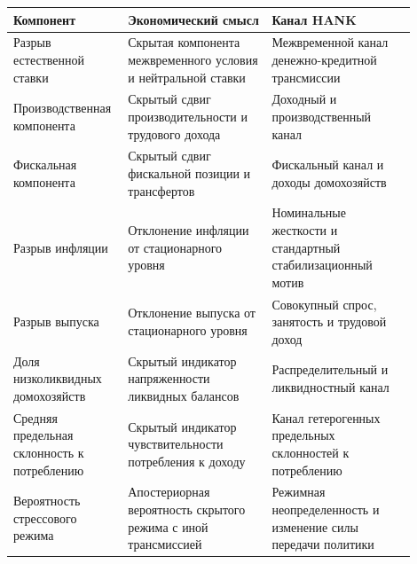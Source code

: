 \begin{tabular}{p{0.22\linewidth}p{0.34\linewidth}p{0.34\linewidth}}
\toprule
Компонент & Экономический смысл & Канал HANK \\
\midrule
Разрыв естественной ставки & Скрытая компонента межвременного условия и нейтральной ставки & Межвременной канал денежно-кредитной трансмиссии \\
Производственная компонента & Скрытый сдвиг производительности и трудового дохода & Доходный и производственный канал \\
Фискальная компонента & Скрытый сдвиг фискальной позиции и трансфертов & Фискальный канал и доходы домохозяйств \\
Разрыв инфляции & Отклонение инфляции от стационарного уровня & Номинальные жесткости и стандартный стабилизационный мотив \\
Разрыв выпуска & Отклонение выпуска от стационарного уровня & Совокупный спрос, занятость и трудовой доход \\
Доля низколиквидных домохозяйств & Скрытый индикатор напряженности ликвидных балансов & Распределительный и ликвидностный канал \\
Средняя предельная склонность к потреблению & Скрытый индикатор чувствительности потребления к доходу & Канал гетерогенных предельных склонностей к потреблению \\
Вероятность стрессового режима & Апостериорная вероятность скрытого режима с иной трансмиссией & Режимная неопределенность и изменение силы передачи политики \\
\bottomrule
\end{tabular}